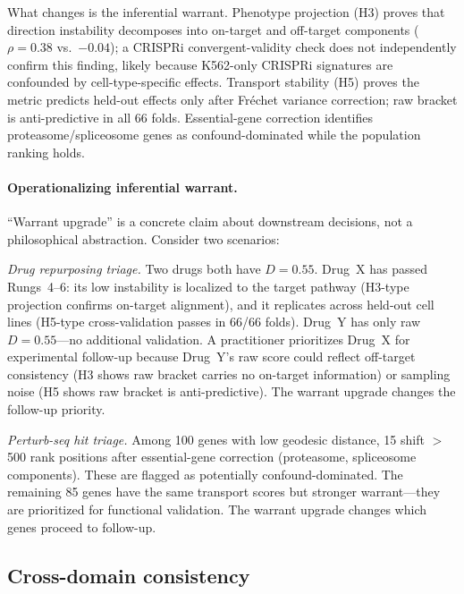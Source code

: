 \documentclass{article}
\begin{document}
What changes is the inferential warrant. Phenotype projection (H3) proves
that direction instability decomposes into on-target and off-target
components ($\rho = 0.38$ vs.\ $-0.04$); a CRISPRi convergent-validity
check does not independently confirm this finding, likely because
K562-only CRISPRi signatures are confounded by cell-type-specific
effects. Transport stability (H5) proves
the metric predicts held-out effects only after Fr\'{e}chet variance
correction; raw bracket is anti-predictive in all 66 folds. Essential-gene
correction identifies proteasome/spliceosome genes as confound-dominated
while the population ranking holds.

\paragraph{Operationalizing inferential warrant.}
``Warrant upgrade'' is a concrete claim about downstream decisions, not
a philosophical abstraction. Consider two scenarios:

\emph{Drug repurposing triage.} Two drugs both have $D = 0.55$.
Drug~X has passed Rungs~4--6: its low instability is localized to the
target pathway (H3-type projection confirms on-target alignment), and it
replicates across held-out cell lines (H5-type cross-validation passes
in 66/66 folds).
Drug~Y has only raw $D = 0.55$---no additional validation. A practitioner
prioritizes Drug~X for experimental follow-up because Drug~Y's raw score
could reflect off-target consistency (H3 shows raw bracket carries no
on-target information) or sampling noise (H5 shows raw bracket is
anti-predictive). The warrant upgrade changes the follow-up priority.

\emph{Perturb-seq hit triage.} Among 100 genes with low geodesic
distance, 15 shift $>$500 rank positions after essential-gene correction
(proteasome, spliceosome components). These are flagged as potentially
confound-dominated. The remaining 85 genes have the same transport
scores but stronger warrant---they are prioritized for functional
validation. The warrant upgrade changes which genes proceed to follow-up.

\subsection{Cross-domain consistency}
\end{document}
